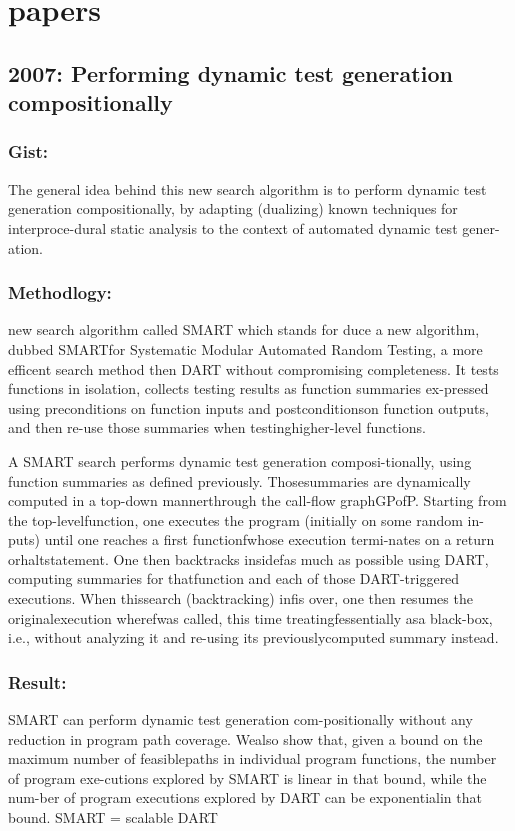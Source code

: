 \documentclass[	runningheads,
				a4paper]{llncs}
\begin{document}
\section{papers}
\subsection{2007: Performing dynamic test generation compositionally}
\cite[paper]{godefroid2007compositional}

\subsubsection{Gist:}
The general idea behind this new search algorithm is to perform dynamic  test generation compositionally, by adapting (dualizing) known techniques for interproce-dural static analysis to the context of automated dynamic test gener-ation.

\subsubsection{Methodlogy:}
new search algorithm called SMART which stands for duce a new algorithm, dubbed SMARTfor Systematic Modular Automated Random Testing, a more efficent search method then DART without compromising
completeness. It tests functions in isolation, collects testing results as function summaries ex-pressed using preconditions on function inputs and postconditionson function outputs, and then re-use those summaries when testinghigher-level functions.

A SMART search performs dynamic test generation composi-tionally,  using  function  summaries  as  defined  previously.  Thosesummaries  are  dynamically  computed  in  a  top-down  mannerthrough the call-flow graphGPofP. Starting from the top-levelfunction, one executes the program (initially on some random in-puts) until one  reaches  a first functionfwhose execution termi-nates on a return orhaltstatement. One then backtracks insidefas much as  possible  using DART, computing summaries  for thatfunction and each of those DART-triggered executions. When thissearch (backtracking)  infis over, one then resumes the originalexecution wherefwas called,  this time treatingfessentially asa black-box,  i.e., without analyzing it and re-using its previouslycomputed  summary  instead. 

\subsubsection{Result:}
SMART can perform dynamic test generation com-positionally without any reduction in program path coverage. Wealso show that, given a bound on the maximum number of feasiblepaths in individual program functions, the number of program exe-cutions explored by SMART is linear in that bound, while the num-ber of program executions explored by DART can be exponentialin that bound.
SMART = scalable DART
\end{document}
